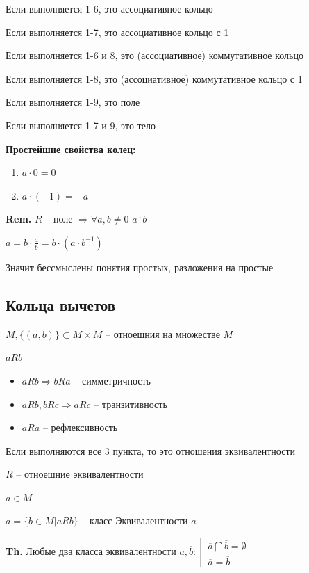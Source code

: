 \documentclass[14pt, letter paper]{article}
\begin{document}
Если выполняется 1-6, это ассоциативное кольцо

Если выполняется 1-7, это ассоциативное кольцо с 1

Если выполняется 1-6 и 8, это (ассоциативное) коммутативное кольцо

Если выполняется 1-8, это (ассоциативное) коммутативное кольцо с 1

Если выполняется 1-9, это поле

Если выполняется 1-7 и 9, это тело

\textbf{Простейшие свойства колец:}

\begin{enumerate}
    \item $a \cdot 0 = 0$
    \item $a \cdot (-1) = -a$
\end{enumerate}

\textbf{Rem.} $R$ -- поле $\Rightarrow \forall a, b \neq 0$ $a \, \vdots \, b$

$a = b \cdot \frac{a}{b} = b \cdot (a \cdot b^{-1})$

Значит бессмыслены понятия простых, разложения на простые

\begin{center}
    \section*{Кольца вычетов}
\end{center}

$M, \{ (a, b) \} \subset M \times M$ -- отноешния на множестве $M$

$aRb$

\begin{itemize}
    \item $aRb \Rightarrow bRa$ -- симметричность
    \item $aRb, bRc \Rightarrow aRc$ -- транзитивность
    \item $aRa$ -- рефлексивность
\end{itemize}

Если выполняются все 3 пункта, то это отношения эквивалентности

$R$ -- отноешние эквивалентности

$a \in M$

$\overline{a} = \{b \in M | aRb \}$ -- класс Эквивалентности $a$

\textbf{Th.} Любые два класса эквивалентности $\overline{a}, \overline{b} : \left[ \begin{gathered}
    \overline{a} \bigcap \overline{b} = \emptyset \\
    \overline{a} = \overline{b}
\end{gathered} \right.$
\end{document}
